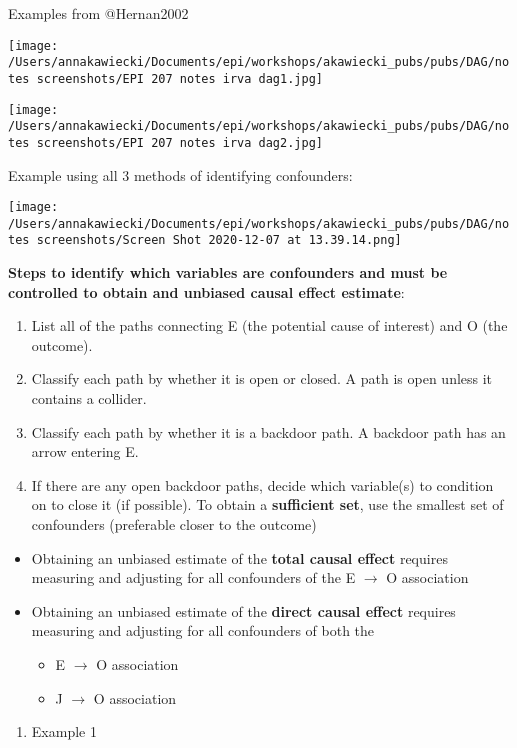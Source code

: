 \documentclass[
]{article}
\providecommand{\tightlist}{%
  \setlength{\itemsep}{0pt}\setlength{\parskip}{0pt}}
\begin{document}
Examples from @Hernan2002

\texttt{[image: /Users/annakawiecki/Documents/epi/workshops/akawiecki\_pubs/pubs/DAG/notes screenshots/EPI 207 notes irva dag1.jpg]}

\texttt{[image: /Users/annakawiecki/Documents/epi/workshops/akawiecki\_pubs/pubs/DAG/notes screenshots/EPI 207 notes irva dag2.jpg]}

Example using all 3 methods of identifying confounders:

\texttt{[image: /Users/annakawiecki/Documents/epi/workshops/akawiecki\_pubs/pubs/DAG/notes screenshots/Screen Shot 2020-12-07 at 13.39.14.png]}

\textbf{Steps to identify which variables are confounders and must be
controlled to obtain and unbiased causal effect estimate}:

\begin{enumerate}
\def\labelenumi{\arabic{enumi}.}
\item
  List all of the paths connecting E (the potential cause of interest)
  and O (the outcome).
\item
  Classify each path by whether it is open or closed. A path is open
  unless it contains a collider.
\item
  Classify each path by whether it is a backdoor path. A backdoor path
  has an arrow entering E.
\item
  If there are any open backdoor paths, decide which variable(s) to
  condition on to close it (if possible). To obtain a \textbf{sufficient
  set}, use the smallest set of confounders (preferable closer to the
  outcome)
\end{enumerate}

\begin{itemize}
\item
  Obtaining an unbiased estimate of the \textbf{total causal effect}
  requires measuring and adjusting for all confounders of the E \(\to\)
  O association
\item
  Obtaining an unbiased estimate of the \textbf{direct causal effect}
  requires measuring and adjusting for all confounders of both the

  \begin{itemize}
  \item
    E \(\to\) O association
  \item
    J \(\to\) O association
  \end{itemize}
\end{itemize}

\begin{enumerate}
\def\labelenumi{\arabic{enumi}.}
\tightlist
\item
  Example 1
\end{enumerate}
\end{document}
